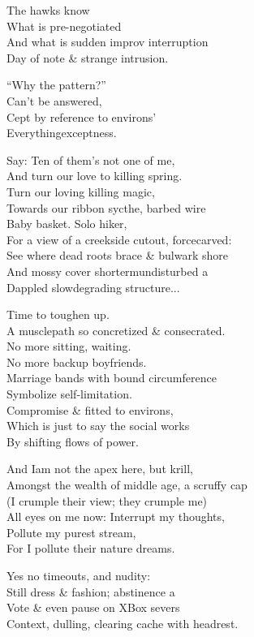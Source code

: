 The hawks know \\
What is pre-negotiated \\
And what is sudden improv interruption \\ 
Day of note \& strange intrusion.

``Why the pattern?'' \\
Can't be answered, \\
Cept by reference to environs' \\
Everythingexceptness.

Say: Ten of them's not one of me, \\
And turn our love to killing spring. \\
Turn our loving killing magic, \\
Towards our ribbon sycthe, barbed wire \\
Baby basket. Solo hiker, \\
For a view of a creekside cutout, forcecarved: \\
See where dead roots brace \& bulwark shore \\
And mossy cover shortermundisturbed a \\
Dappled slowdegrading structure... 

Time to toughen up. \\
A musclepath so concretized \& consecrated. \\
No more sitting, waiting. \\
No more backup boyfriends. \\
Marriage bands with bound circumference \\
Symbolize self-limitation. \\
Compromise \& fitted to environs, \\
Which is just to say the social works \\
By shifting flows of power.

And Iam not the apex here, but krill, \\
Amongst the wealth of middle age, a scruffy cap \\
(I crumple their view; they crumple me) \\
All eyes on me now: Interrupt my thoughts, \\
Pollute my purest stream, \\
For I pollute their nature dreams.

Yes no timeouts, and nudity: \\
Still dress \& fashion; abstinence a \\
Vote \& even pause on XBox severs \\
Context, dulling, clearing cache with headrest.

